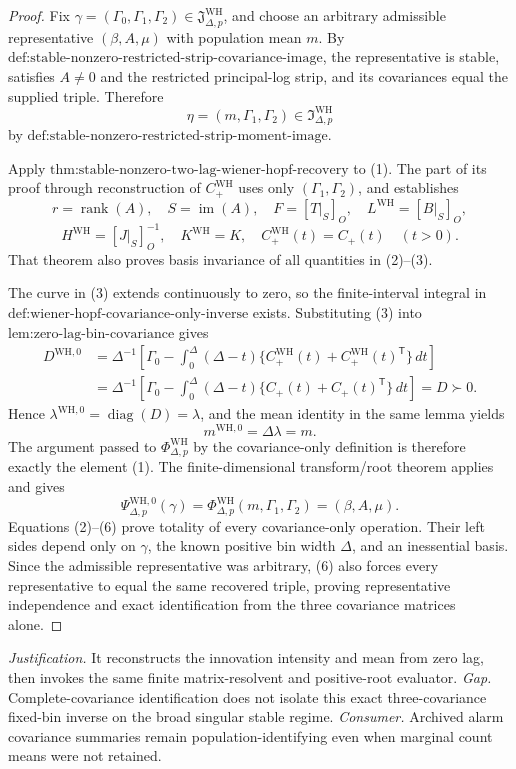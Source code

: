 \documentclass{article}
\begin{document}
\begin{proof}
Fix \(\gamma=(\Gamma_0,\Gamma_1,\Gamma_2)\in\mathfrak J_{\Delta,p}^{\mathrm{WH}}\), and choose an arbitrary admissible representative \((\beta,A,\mu)\) with population mean \(m\).  By \(\text{def:stable-nonzero-restricted-strip-covariance-image}\), the representative is stable, satisfies \(A\neq0\) and the restricted principal-log strip, and its covariances equal the supplied triple.  Therefore
\[
 \eta=(m,\Gamma_1,\Gamma_2)\in\mathfrak I_{\Delta,p}^{\mathrm{WH}}
\tag{1}
\]
by \(\text{def:stable-nonzero-restricted-strip-moment-image}\).

Apply \(\text{thm:stable-nonzero-two-lag-wiener-hopf-recovery}\) to (1).  The part of its proof through reconstruction of \(C_{+}^{\mathrm{WH}}\) uses only \((\Gamma_1,\Gamma_2)\), and establishes
\[
 r=\operatorname{rank}(A),\quad S=\operatorname{im}(A),\quad
 F=[T|_S]_O,\quad L^{\mathrm{WH}}=[B|_S]_O,
\tag{2}
\]
\[
 H^{\mathrm{WH}}=[J|_S]_O^{-1},\quad K^{\mathrm{WH}}=K,\quad
 C_{+}^{\mathrm{WH}}(t)=C_{+}(t)\quad(t>0).
\tag{3}
\]
That theorem also proves basis invariance of all quantities in (2)--(3).

The curve in (3) extends continuously to zero, so the finite-interval integral in \(\text{def:wiener-hopf-covariance-only-inverse}\) exists.  Substituting (3) into \(\text{lem:zero-lag-bin-covariance}\) gives
\[
 \begin{aligned}
 D^{\mathrm{WH},0}
 &=\Delta^{-1}\!\left[\Gamma_0-
 \int_0^\Delta(\Delta-t)
 \{C_{+}^{\mathrm{WH}}(t)+C_{+}^{\mathrm{WH}}(t)^{\mathsf T}\}\,dt\right]\\
 &=\Delta^{-1}\!\left[\Gamma_0-
 \int_0^\Delta(\Delta-t)
 \{C_{+}(t)+C_{+}(t)^{\mathsf T}\}\,dt\right]=D\succ0.
 \end{aligned}
\tag{4}
\]
Hence \(\lambda^{\mathrm{WH},0}=\operatorname{diag}(D)=\lambda\), and the mean identity in the same lemma yields
\[
 m^{\mathrm{WH},0}=\Delta\lambda=m.
\tag{5}
\]
The argument passed to \(\Phi_{\Delta,p}^{\mathrm{WH}}\) by the covariance-only definition is therefore exactly the element (1).  The finite-dimensional transform/root theorem applies and gives
\[
 \Psi_{\Delta,p}^{\mathrm{WH},0}(\gamma)
 =\Phi_{\Delta,p}^{\mathrm{WH}}(m,\Gamma_1,\Gamma_2)
 =(\beta,A,\mu).
\tag{6}
\]
Equations (2)--(6) prove totality of every covariance-only operation.  Their left sides depend only on \(\gamma\), the known positive bin width \(\Delta\), and an inessential basis.  Since the admissible representative was arbitrary, (6) also forces every representative to equal the same recovered triple, proving representative independence and exact identification from the three covariance matrices alone.
\end{proof}
\par\smallskip\noindent \textit{Justification.} It reconstructs the innovation intensity and mean from zero lag, then invokes the same finite matrix-resolvent and positive-root evaluator. \textit{Gap.} Complete-covariance identification does not isolate this exact three-covariance fixed-bin inverse on the broad singular stable regime. \textit{Consumer.} Archived alarm covariance summaries remain population-identifying even when marginal count means were not retained.
\end{document}
